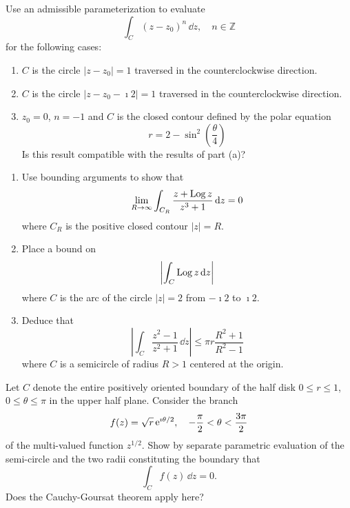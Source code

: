{\begin{Exercise}
  \label{exercise integrate z-z0 n}
  Use an admissible parameterization to evaluate
  \[
  \int_C (z - z_0)^n \,\dd z, \quad n \in \mathbb{Z}
  \]
  for the following cases:
  \begin{enumerate}
  \item 
    $C$ is the circle $|z - z_0| = 1$ traversed in the counterclockwise 
    direction.
  \item 
    $C$ is the circle $|z - z_0 - \imath 2| = 1$ traversed in the 
    counterclockwise direction.
  \item 
    $z_0 = 0$, $n = -1$ and $C$ is the closed contour defined by the polar 
    equation
    \[
    r = 2 - \sin^2 \left( \frac{\theta}{4} \right)
    \]
    Is this result compatible with the results of part (a)?
  \end{enumerate}

\end{Exercise}





\begin{Exercise}
  \label{exercise bound z Log z z3+1}
  \begin{enumerate}
  \item 
    Use bounding arguments to show that
    \[
    \lim_{R \to \infty} \int_{C_R} \frac{z + \mathop{\mathrm{Log}}\nolimits z}{z^3 + 1}\,\mathrm{d} z = 0
    \]
    where $C_R$ is the positive closed contour $|z| = R$.
  \item 
    Place a bound on 
    \[
    \left| \int_C \mathop{\mathrm{Log}}\nolimits z\,\mathrm{d} z \right|
    \]
    where $C$ is the arc of the circle $|z| = 2$ from $- \imath 2$ to $\imath 2$.
  \item 
    Deduce that 
    \[
    \left| \int_C \frac{ z^2 - 1 }{ z^2 + 1 } \,\dd z \right| 
    \leq \pi r \frac{R^2 + 1}{R^2 - 1}
    \]
    where $C$ is a semicircle of radius $R > 1$ centered at the origin.
  \end{enumerate}

\end{Exercise}




\begin{Exercise}
  \label{exercise parametric evaluation sqrt z}
  Let $C$ denote the entire positively oriented boundary of the half disk
  $0 \leq r \leq 1$, $0 \leq \theta \leq \pi$ in the upper half plane.  Consider the branch
  \[
  f(z) = \sqrt{r} \mathop{\mathrm{e}}\nolimits^{\imath \theta/2}, \quad - \frac{\pi}{2} < \theta < \frac{3 \pi}{2}
  \]
  of the multi-valued function $z^{1/2}$. Show by separate parametric evaluation 
  of the semi-circle and the two radii constituting the boundary that
  \[
  \int_C f(z) \,\dd z = 0.
  \]
  Does the Cauchy-Goursat theorem apply here?


\end{Exercise}}

